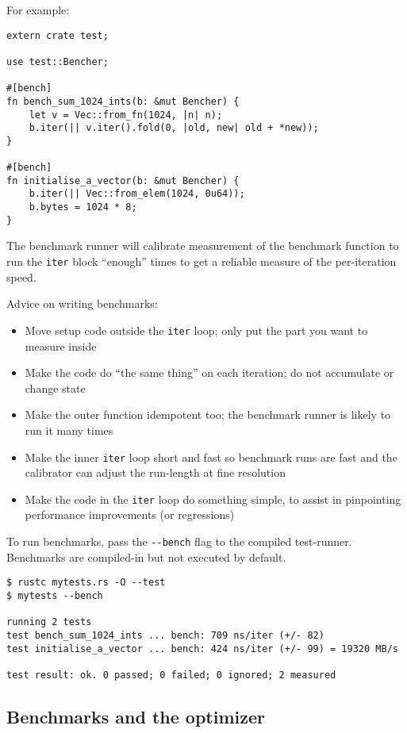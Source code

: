 \documentclass[]{article}
\begin{document}
For example:

\begin{verbatim}
extern crate test;

use test::Bencher;

#[bench]
fn bench_sum_1024_ints(b: &mut Bencher) {
    let v = Vec::from_fn(1024, |n| n);
    b.iter(|| v.iter().fold(0, |old, new| old + *new));
}

#[bench]
fn initialise_a_vector(b: &mut Bencher) {
    b.iter(|| Vec::from_elem(1024, 0u64));
    b.bytes = 1024 * 8;
}
\end{verbatim}

The benchmark runner will calibrate measurement of the benchmark
function to run the \texttt{iter} block ``enough'' times to get a
reliable measure of the per-iteration speed.

Advice on writing benchmarks:

\begin{itemize}
\itemsep1pt\parskip0pt
\item
  Move setup code outside the \texttt{iter} loop; only put the part you
  want to measure inside
\item
  Make the code do ``the same thing'' on each iteration; do not
  accumulate or change state
\item
  Make the outer function idempotent too; the benchmark runner is likely
  to run it many times
\item
  Make the inner \texttt{iter} loop short and fast so benchmark runs are
  fast and the calibrator can adjust the run-length at fine resolution
\item
  Make the code in the \texttt{iter} loop do something simple, to assist
  in pinpointing performance improvements (or regressions)
\end{itemize}

To run benchmarks, pass the \texttt{-\/-bench} flag to the compiled
test-runner. Benchmarks are compiled-in but not executed by default.

\begin{verbatim}
$ rustc mytests.rs -O --test
$ mytests --bench

running 2 tests
test bench_sum_1024_ints ... bench: 709 ns/iter (+/- 82)
test initialise_a_vector ... bench: 424 ns/iter (+/- 99) = 19320 MB/s

test result: ok. 0 passed; 0 failed; 0 ignored; 2 measured
\end{verbatim}

\subsection{Benchmarks and the
optimizer}\label{benchmarks-and-the-optimizer}
\end{document}
